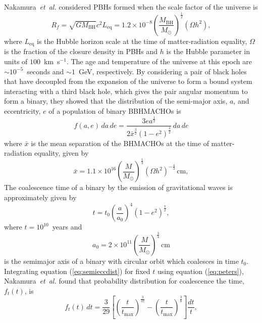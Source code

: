 Nakamura~\emph{et~al.} considered PBHs formed when the scale factor of the
universe is\cite{Nakamura:1997sm}
\begin{equation}
R_f = \sqrt{GM_\mathrm{BH}}{c^2L_\mathrm{eq}} =
1.2\times 10^{-8} \left(\frac{M_\mathrm{BH}}{M_\odot}\right)^\frac{1}{2}
(\Omega h^2),
\end{equation}
where $L_\mathrm{eq}$ is the Hubble horizon scale at the time of
matter-radiation equality, $\Omega$ is the fraction of the closure density in
PBHs and $h$ is the Hubble parameter in units of $100$~km~s$^{-1}$. The age
and temperature of the universe at this epoch are $\sim 10^{-5}$~seconds and
$\sim 1$~GeV, respectively. By considering a pair of black holes that have
decoupled from the expansion of the universe to form a bound system
interacting with a third black hole, which gives the pair angular momentum to
form a binary, they showed that the distribution of the semi-major axis, $a$,
and eccentricity, $e$ of a population of binary BBHMACHOs is
\begin{equation}
f(a,e)\, da\, de = 
\frac{ 3ea^{\frac{1}{2}} }
{ 2\bar{x}^{\frac{3}{2}} (1-e^2)^{\frac{3}{2}}  } \, da\, de 
\label{eq:semieccdist}
\end{equation}
where $\bar{x}$ is the mean separation of the BHMACHOs at the time of
matter-radiation equality, given by
\begin{equation}
\bar{x} = 1.1 \times 10^{16} \left(\frac{M}{M_\odot}\right)^{\frac{1}{3}}
\left(\Omega h^2\right)^{-\frac{4}{3}} \,\mathrm{cm},
\end{equation}
The coalescence time of a binary by the emission of gravitational waves is
approximately given by
\cite{Peters:1964}
\begin{equation}
t = t_0 \left(\frac{a}{a_0}\right)^4 \left(1 - e^2\right)^{\frac{7}{2}},
\label{eq:peters}
\end{equation}
where $t = 10^{10}$~years and
\begin{equation}
a_0 = 2 \times 10^{11}
\left(\frac{M}{M_\odot}\right)^{\frac{3}{4}}\,\mathrm{cm}
\end{equation}
is the semimajor axis of a binary with circular orbit which coalesces in time
$t_0$. Integrating equation (\ref{eq:semieccdist}) for fixed $t$ using equation
(\ref{eq:peters}), Nakamura~\emph{et~al.} found that probability distribution
for coalescence the time, $f_t(t)$, is
\begin{equation}
f_t(t)\,dt = \frac{3}{29}\left[
\left(\frac{t}{t_\mathrm{max}}\right)^{\frac{3}{37}} -
\left(\frac{t}{t_\mathrm{max}}\right)^{\frac{3}{8}}\right] \frac{dt}{t},
\end{equation}
